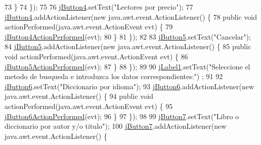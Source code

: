 \begin{DoxyCode}
73             \}
74         \});
75 
76         \mbox{\hyperlink{class_interfaz_package_1_1_consulta_busqueda_a3c5a2c3d6a507e80ad771d8ab4ebd891}{jButton4}}.setText(\textcolor{stringliteral}{"Lectores por precio"});
77         \mbox{\hyperlink{class_interfaz_package_1_1_consulta_busqueda_a3c5a2c3d6a507e80ad771d8ab4ebd891}{jButton4}}.addActionListener(\textcolor{keyword}{new} java.awt.event.ActionListener() \{
78             \textcolor{keyword}{public} \textcolor{keywordtype}{void} actionPerformed(java.awt.event.ActionEvent evt) \{
79                 \mbox{\hyperlink{class_interfaz_package_1_1_consulta_busqueda_ae40b8c7aa3f93785b928af92fe58d91f}{jButton4ActionPerformed}}(evt);
80             \}
81         \});
82 
83         \mbox{\hyperlink{class_interfaz_package_1_1_consulta_busqueda_a92a758e63cc825dd1292869d625115dd}{jButton5}}.setText(\textcolor{stringliteral}{"Cancelar"});
84         \mbox{\hyperlink{class_interfaz_package_1_1_consulta_busqueda_a92a758e63cc825dd1292869d625115dd}{jButton5}}.addActionListener(\textcolor{keyword}{new} java.awt.event.ActionListener() \{
85             \textcolor{keyword}{public} \textcolor{keywordtype}{void} actionPerformed(java.awt.event.ActionEvent evt) \{
86                 \mbox{\hyperlink{class_interfaz_package_1_1_consulta_busqueda_a005ad36a62a45a951e73f6d37f28c883}{jButton5ActionPerformed}}(evt);
87             \}
88         \});
89 
90         \mbox{\hyperlink{class_interfaz_package_1_1_consulta_busqueda_a53ca3d311b9b50620390029bffe04529}{jLabel1}}.setText(\textcolor{stringliteral}{"Seleccione el metodo de busqueda e introduzca los datos correspondientes:"})
      ;
91 
92         \mbox{\hyperlink{class_interfaz_package_1_1_consulta_busqueda_a7cf19c14b7eb6a2bd1e460fcce0c2ffa}{jButton6}}.setText(\textcolor{stringliteral}{"Diccionario por idioma"});
93         \mbox{\hyperlink{class_interfaz_package_1_1_consulta_busqueda_a7cf19c14b7eb6a2bd1e460fcce0c2ffa}{jButton6}}.addActionListener(\textcolor{keyword}{new} java.awt.event.ActionListener() \{
94             \textcolor{keyword}{public} \textcolor{keywordtype}{void} actionPerformed(java.awt.event.ActionEvent evt) \{
95                 \mbox{\hyperlink{class_interfaz_package_1_1_consulta_busqueda_a2aa00c4b05ad23e9de48255e16c2ec5b}{jButton6ActionPerformed}}(evt);
96             \}
97         \});
98 
99         \mbox{\hyperlink{class_interfaz_package_1_1_consulta_busqueda_a80ca243a28d5b45e1f3a0e97c5cfb819}{jButton7}}.setText(\textcolor{stringliteral}{"Libro o diccionario por autor y/o titulo"});
100         \mbox{\hyperlink{class_interfaz_package_1_1_consulta_busqueda_a80ca243a28d5b45e1f3a0e97c5cfb819}{jButton7}}.addActionListener(\textcolor{keyword}{new} java.awt.event.ActionListener() \{

\end{DoxyCode}
